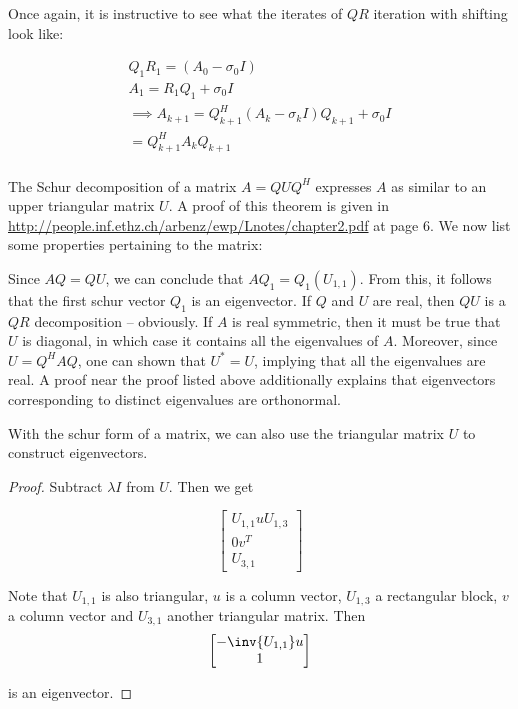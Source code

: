 \documentclass[../main.tex]{subfiles}
\begin{document}
\begin{remark}
    Once again, it is instructive to see what the iterates of $QR$ iteration with shifting look like:

    \begin{align*}
        Q_1R_1 = (A_0 - \sigma_0 I) \\
        A_1 = R_1Q_1 + \sigma_0 I \\
        \implies A_{k+1} = Q_{k+1}^H(A_{k} - \sigma_{k}I)Q_{k+1} + \sigma_0 I \\
        = Q_{k+1}^H A_{k} Q_{k+1} \\
    \end{align*}
\end{remark}




\begin{definition}
    The Schur decomposition of a matrix $A = QUQ^H$ expresses $A$ as similar to an upper triangular matrix $U$. A proof of this theorem is given in \url{http://people.inf.ethz.ch/arbenz/ewp/Lnotes/chapter2.pdf} at page 6. We now list some properties pertaining to the matrix:

    \begin{outline}
        \1 Since $AQ = QU$, we can conclude that $AQ_1 = Q_1(U_{1,1})$. From this, it follows that the first schur vector $Q_1$ is an eigenvector.
        \1 If $Q$ and $U$ are real, then $QU$ is a $QR$ decomposition -- obviously.
        \1 If $A$ is real symmetric, then it must be true that $U$ is diagonal, in which case it contains all the eigenvalues of $A$. 
        \2 Moreover, since $U = Q^HAQ$, one can shown that $U^{*} = U$, implying that all the eigenvalues are real. A proof near the proof listed above additionally explains that eigenvectors corresponding to distinct eigenvalues are orthonormal.
    \end{outline}
\end{definition}

\begin{proposition}
    With the schur form of a matrix, we can also use the triangular matrix $U$ to construct eigenvectors.
\end{proposition}

\begin{proof}
    Subtract $\lambda I$ from $U$. Then we get

    \[
        \begin{bmatrix}
            U_{1,1} u U_{1,3} \\
            0 v^T \\
            U_{3,1}
        \end{bmatrix}
    \]

    Note that $U_{1,1}$ is also triangular, $u$ is a column vector, $U_{1,3}$ a rectangular block, $v$ a column vector and $U_{3,1}$ another triangular matrix. Then 
    \[
        \begin{bmatrix}
            -\inv{U_{1,1}} u \\
            1 \\
        \end{bmatrix}
    \]

    is an eigenvector.
\end{proof}
\end{document}
